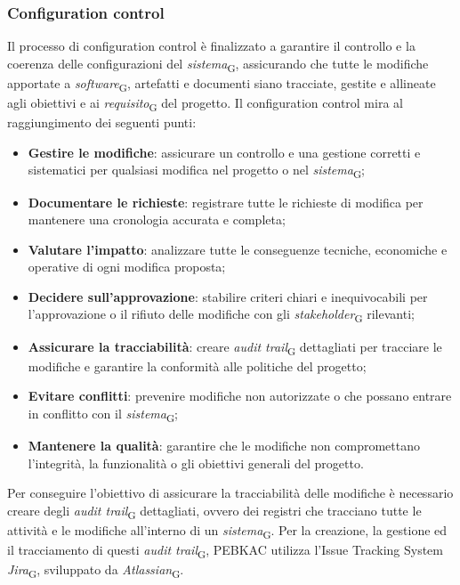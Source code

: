\subsubsection{Configuration control}
Il processo di configuration control è finalizzato a garantire il controllo e la coerenza delle configurazioni del \textit{sistema}\textsubscript{G}, assicurando che tutte le modifiche apportate a \textit{software}\textsubscript{G}, artefatti e documenti siano tracciate, gestite e allineate agli obiettivi e ai \textit{requisito}\textsubscript{G} del progetto.
Il configuration control mira al raggiungimento dei seguenti punti:
\begin{itemize}
    \item \textbf{Gestire le modifiche}: assicurare un controllo e una gestione corretti e sistematici per qualsiasi modifica nel progetto o nel \textit{sistema}\textsubscript{G};
    \item \textbf{Documentare le richieste}: registrare tutte le richieste di modifica per mantenere una cronologia accurata e completa;
    \item \textbf{Valutare l'impatto}: analizzare tutte le conseguenze tecniche, economiche e operative di ogni modifica proposta;
    \item \textbf{Decidere sull'approvazione}: stabilire criteri chiari e inequivocabili per l'approvazione o il rifiuto delle modifiche con gli \textit{stakeholder}\textsubscript{G} rilevanti;
    \item \textbf{Assicurare la tracciabilità}: creare \textit{audit trail}\textsubscript{G} dettagliati per tracciare le modifiche e garantire la conformità alle politiche del progetto;
    \item \textbf{Evitare conflitti}: prevenire modifiche non autorizzate o che possano entrare in conflitto con il \textit{sistema}\textsubscript{G};
    \item \textbf{Mantenere la qualità}: garantire che le modifiche non compromettano l'integrità, la funzionalità o gli obiettivi generali del progetto.
\end{itemize}
Per conseguire l'obiettivo di assicurare la tracciabilità delle modifiche è necessario creare degli \textit{audit trail}\textsubscript{G} dettagliati, ovvero dei registri che tracciano tutte le attività e le modifiche all'interno di un \textit{sistema}\textsubscript{G}. Per la creazione, la gestione ed il tracciamento di questi \textit{audit trail}\textsubscript{G}, PEBKAC utilizza l'Issue Tracking System \textit{Jira}\textsubscript{G}, sviluppato da \textit{Atlassian}\textsubscript{G}.
